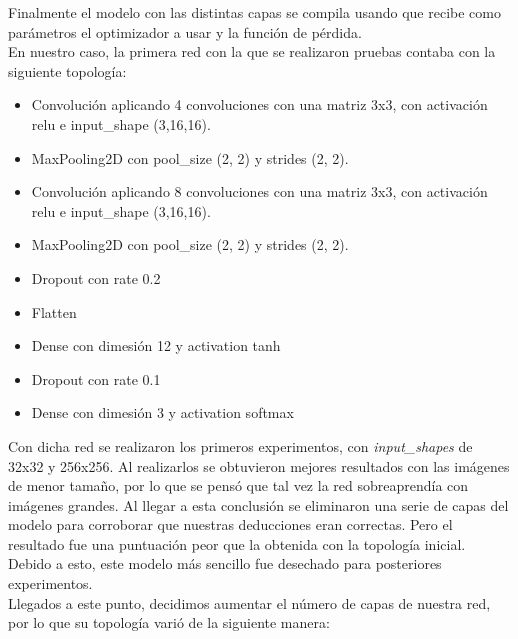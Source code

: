 Finalmente el modelo con las distintas capas se compila usando  que recibe como parámetros el optimizador a usar y la función de pérdida.\\

En nuestro caso, la primera red con la que se realizaron pruebas contaba con la siguiente topología:

\begin{itemize}
\item Convolución aplicando 4 convoluciones con una matriz 3x3, con activación relu e input\_shape (3,16,16).
\item MaxPooling2D con pool\_size (2, 2) y strides (2, 2).
\item Convolución aplicando 8 convoluciones con una matriz 3x3, con activación relu e input\_shape (3,16,16).
\item MaxPooling2D con pool\_size (2, 2) y strides (2, 2).
\item Dropout con rate 0.2
\item Flatten
\item Dense con dimesión 12 y activation tanh
\item Dropout con rate 0.1
\item Dense con dimesión 3 y activation softmax
\end{itemize}

Con dicha red se realizaron los primeros experimentos, con \textit{input\_shapes} de 32x32 y 256x256. Al realizarlos se obtuvieron mejores resultados con las imágenes de menor tamaño, por lo que se pensó que tal vez la red sobreaprendía con imágenes grandes. Al llegar a esta conclusión se eliminaron una serie de capas del modelo para corroborar que nuestras deducciones eran correctas. Pero el resultado fue una puntuación peor que la obtenida con la topología inicial. Debido a esto, este modelo más sencillo fue desechado para posteriores experimentos.\\

Llegados a este punto, decidimos aumentar el número de capas de nuestra red, por lo que su topología varió de la siguiente manera:

